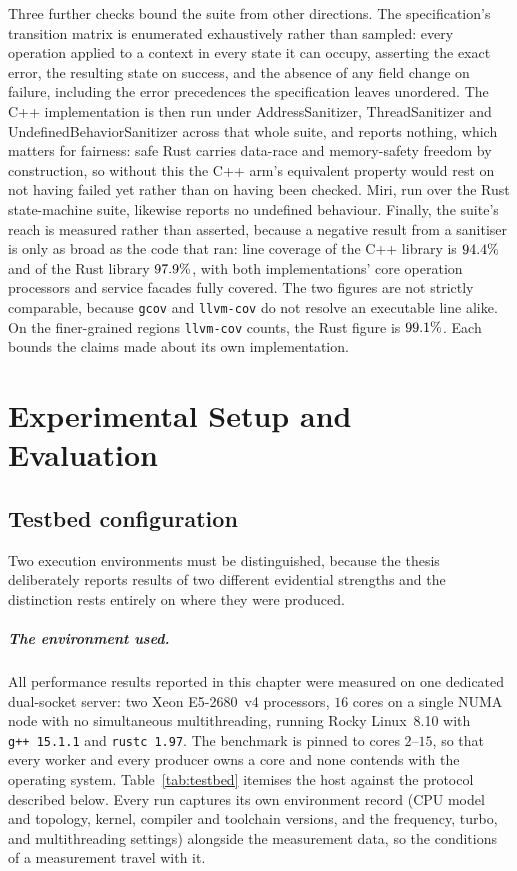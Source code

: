\documentclass[english,twoside,openright,a4paper,censored,csm,software-track-2020]{HYthesisML}
\begin{document}
Three further checks bound the suite from other directions. The specification's transition
matrix is enumerated exhaustively rather than sampled: every operation applied to a context in
every state it can occupy, asserting the exact error, the resulting state on success, and the
absence of any field change on failure, including the error precedences the specification
leaves unordered. The C++ implementation is then run under AddressSanitizer, ThreadSanitizer
and UndefinedBehaviorSanitizer across that whole suite, and reports nothing, which matters for
fairness: safe Rust carries data-race and memory-safety freedom by construction, so without
this the C++ arm's equivalent property would rest on not having failed yet rather than on
having been checked. Miri, run over the Rust state-machine suite, likewise reports no
undefined behaviour. Finally, the suite's reach is measured rather than asserted, because a
negative result from a sanitiser is only as broad as the code that ran: line coverage of the
C++ library is $94.4\%$ and of the Rust library $97.9\%$, with both implementations' core
operation processors and service facades fully covered. The two figures are not strictly
comparable, because \texttt{gcov} and \texttt{llvm-cov} do not resolve an executable line alike.
On the finer-grained regions \texttt{llvm-cov} counts, the Rust figure is $99.1\%$.
Each bounds the claims made about its own implementation.

\chapter{Experimental Setup and Evaluation\label{chapter:eval}}

\section{Testbed configuration\label{sec:testbed}}
Two execution environments must be distinguished, because the thesis deliberately reports
results of two different evidential strengths and the distinction rests entirely on where
they were produced.

\paragraph{The environment used.}
All performance results reported in this chapter were measured on one dedicated dual-socket
server: two Xeon E5-2680~v4 processors, $16$ cores on a single NUMA node with no simultaneous
multithreading, running Rocky Linux~8.10 with \texttt{g++~15.1.1} and \texttt{rustc~1.97}. The
benchmark is pinned to cores $2$--$15$, so that every worker and every producer owns a core and
none contends with the operating system. Table~\ref{tab:testbed} itemises the host against the
protocol described below. Every run captures its own
environment record (CPU model and topology, kernel, compiler and toolchain versions, and the
frequency, turbo, and multithreading settings) alongside the measurement data, so the conditions
of a measurement travel with it.
\end{document}
